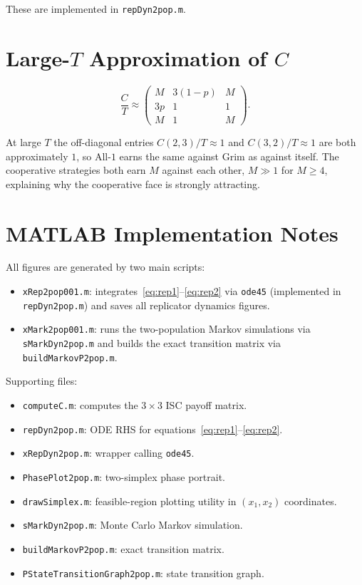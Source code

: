 \documentclass[12pt,a4paper]{article}
\begin{document}
\noindent These are implemented in \texttt{repDyn2pop.m}.

\section{Large-$T$ Approximation of $C$}

\[
\frac{C}{T}\approx\begin{pmatrix} M & 3(1-p) & M \\ 3p & 1 & 1 \\ M & 1 & M\end{pmatrix}.
\]

At large $T$ the off-diagonal entries $C(2,3)/T\approx 1$ and $C(3,2)/T\approx 1$
are both approximately $1$, so All-$1$ earns the same against Grim as against
itself.  The cooperative strategies both earn $M$ against each other, $M\gg 1$
for $M\geq 4$, explaining why the cooperative face is strongly attracting.

\section{MATLAB Implementation Notes}

All figures are generated by two main scripts:
\begin{itemize}
  \item \texttt{xRep2pop001.m}: integrates~\eqref{eq:rep1}--\eqref{eq:rep2}
        via \texttt{ode45} (implemented in \texttt{repDyn2pop.m}) and saves
        all replicator dynamics figures.
  \item \texttt{xMark2pop001.m}: runs the two-population Markov simulations
        via \texttt{sMarkDyn2pop.m} and builds the exact transition matrix
        via \texttt{buildMarkovP2pop.m}.
\end{itemize}

Supporting files:
\begin{itemize}
  \item \texttt{computeC.m}: computes the $3\times3$ ISC payoff matrix.
  \item \texttt{repDyn2pop.m}: ODE RHS for equations~\eqref{eq:rep1}--\eqref{eq:rep2}.
  \item \texttt{xRepDyn2pop.m}: wrapper calling \texttt{ode45}.
  \item \texttt{PhasePlot2pop.m}: two-simplex phase portrait.
  \item \texttt{drawSimplex.m}: feasible-region plotting utility in
        $(x_1,x_2)$ coordinates.
  \item \texttt{sMarkDyn2pop.m}: Monte Carlo Markov simulation.
  \item \texttt{buildMarkovP2pop.m}: exact transition matrix.
  \item \texttt{PStateTransitionGraph2pop.m}: state transition graph.
\end{itemize}
\end{document}
